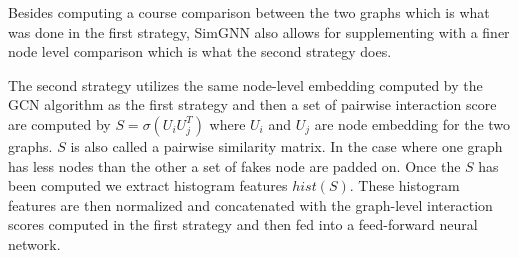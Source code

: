 Besides computing a course comparison between the two graphs which is what was done in the first strategy, SimGNN also allows for supplementing with a finer node level comparison which is what the second strategy does.

The second strategy utilizes the same node-level embedding computed by the GCN algorithm as the first strategy and then a set of pairwise interaction score are computed by $S = \sigma(U_iU_j^T)$ where $U_i$ and $U_j$ are node embedding for the two graphs. $S$ is also called a pairwise similarity matrix. In the case where one graph has less nodes than the other a set of fakes node are padded on. Once the $S$ has been computed we extract histogram features $hist(S)$. These histogram features are then normalized and concatenated with the graph-level interaction scores computed in the first strategy and then fed into a feed-forward neural network\cite{Bai2018}.



